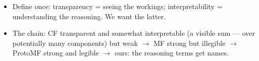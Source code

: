 \begin{itemize}
    \item Define once: transparency = seeing the workings; interpretability = understanding the reasoning. We want the latter.
    \item The chain: CF transparent and somewhat interpretable (a visible sum — over potentially many components) but weak $\to$ MF strong but illegible $\to$ ProtoMF strong and legible $\to$ ours: the reasoning terms get names. 

\end{itemize}
